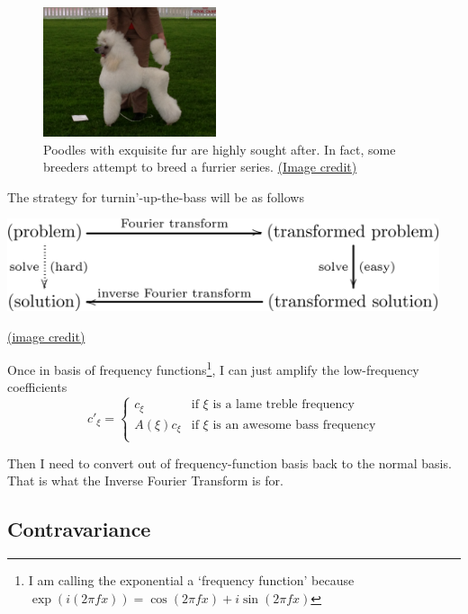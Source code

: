 \documentclass[12pt,letterpaper,oneside]{article}
\begin{document}
\begin{figure}
\begin{center}
\includegraphics[width=2.0in]{poodle.jpg}
\caption{Poodles with exquisite fur are highly sought after. In fact, some breeders attempt to breed a furrier series. \href{https://commons.wikimedia.org/wiki/File:Poodle,_white_standard_04.jpg}{(Image credit)}}
\end{center}
\end{figure}

The strategy for turnin'-up-the-bass will be as follows \vspace{0.1in}

\begin{center}
  \includegraphics[width=5in]{fourier_strategy_svg.png}

 \href{https://commons.wikimedia.org/wiki/File:Commutative_diagram_illustrating_problem_solving_via_the_Fourier_transform.svg}{(image credit)}
\end{center}

Once in basis of frequency functions\footnote{I am calling the exponential a `frequency function' because $\exp(i(2\pi fx)) = \cos (2 \pi f x) + i \sin (2 \pi f x)$}, I can just amplify the low-frequency coefficients $$c'_\xi = \begin{cases}
c_\xi & \textrm{if }\xi\textrm{ is a lame treble frequency} \\ 
A(\xi)c_\xi & \textrm{if }\xi\textrm{ is an awesome bass frequency} \\ 
\end{cases} $$

Then I need to convert out of frequency-function basis back to the normal basis. That is what the Inverse Fourier Transform is for.

\subsection{Contravariance}
\end{document}
